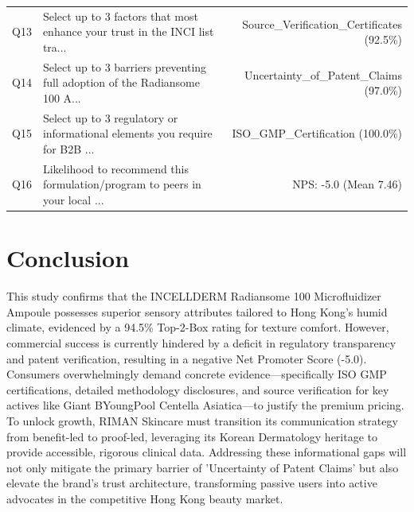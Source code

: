 \documentclass[10pt,twocolumn,a4paper]{article}
\begin{document}
\begin{table}[t]
\begin{tabularx}{\textwidth}{l X r}
Q13 & Select up to 3 factors that most enhance your trust in the INCI list tra... & Source\_Verification\_Certificates (92.5\%) \\
Q14 & Select up to 3 barriers preventing full adoption of the Radiansome 100 A... & Uncertainty\_of\_Patent\_Claims (97.0\%) \\
Q15 & Select up to 3 regulatory or informational elements you require for B2B ... & ISO\_GMP\_Certification (100.0\%) \\
Q16 & Likelihood to recommend this formulation/program to peers in your local ... & NPS: -5.0 (Mean 7.46) \\
\bottomrule
\end{tabularx}
\end{table}

\section{Conclusion}
This study confirms that the INCELLDERM Radiansome 100 Microfluidizer Ampoule possesses superior sensory attributes tailored to Hong Kong's humid climate, evidenced by a 94.5\% Top-2-Box rating for texture comfort. However, commercial success is currently hindered by a deficit in regulatory transparency and patent verification, resulting in a negative Net Promoter Score (-5.0). Consumers overwhelmingly demand concrete evidence—specifically ISO GMP certifications, detailed methodology disclosures, and source verification for key actives like Giant BYoungPool Centella Asiatica—to justify the premium pricing. To unlock growth, RIMAN Skincare must transition its communication strategy from benefit-led to proof-led, leveraging its Korean Dermatology heritage to provide accessible, rigorous clinical data. Addressing these informational gaps will not only mitigate the primary barrier of 'Uncertainty of Patent Claims' but also elevate the brand's trust architecture, transforming passive users into active advocates in the competitive Hong Kong beauty market.
\end{document}
